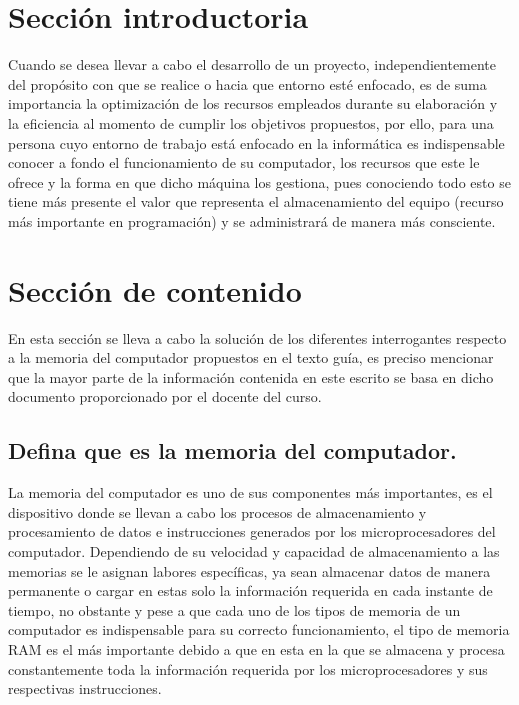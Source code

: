 \documentclass{article}
\begin{document}
\section{Sección introductoria}\label{intro}
Cuando se desea llevar a cabo el desarrollo de un proyecto, independientemente del propósito con que se realice o hacia que entorno esté enfocado, es de suma importancia la optimización de los recursos empleados durante su elaboración y la eficiencia al momento de cumplir los objetivos propuestos, por ello, para una persona cuyo entorno de trabajo está enfocado en la informática es indispensable conocer a fondo el funcionamiento de su computador, los recursos que este le ofrece y la forma en que dicho máquina los gestiona, pues conociendo todo esto se tiene más presente el valor que representa el almacenamiento del equipo (recurso más importante en programación) y se administrará de manera más consciente. 

\section{Sección de contenido} \label{contenido}
En esta sección se lleva a cabo la solución de los diferentes interrogantes respecto a la memoria del computador propuestos en el texto guía, es preciso mencionar que la mayor parte de la información contenida en este escrito se basa en dicho documento proporcionado por el docente del curso.\cite{Taller}

\subsection{Defina que es la memoria del computador.}

La memoria del computador es uno de sus componentes más importantes, es el dispositivo donde se llevan a cabo los procesos de almacenamiento y procesamiento de datos e instrucciones generados por los microprocesadores del computador. Dependiendo de su velocidad y capacidad de almacenamiento a las memorias se le asignan labores específicas, ya sean almacenar datos de manera permanente o cargar en estas solo la información requerida en cada instante de tiempo, no obstante y pese a que cada uno de los tipos de memoria de un computador es indispensable para su correcto funcionamiento, el tipo de memoria RAM es el más importante debido a que en esta en la que se almacena y procesa constantemente toda la información requerida por los microprocesadores y sus respectivas instrucciones.
\end{document}
